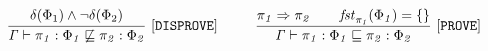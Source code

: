  \begin{gather*}
\frac{
\begin{matrix}
\text{\codeme{\delta(\effect_1) \wedge \neg \delta(\effect_2) }}
\end{matrix}
}{\text{\code{\Gamma  \vdash  \pi_1 : \effect_1 \not\CONTAIN  \pi_2 : \effect_2 }}}\ \codeme{  [DISPROVE]} 
\qquad\ \ 
\frac{
\begin{matrix}
\text{\code{\pi_1 \Rightarrow \pi_2 \quad\ \  
\m{fst}_{\pi_1}(\effect_1) = \{\}
}}
\end{matrix}
}{\text{\code{\Gamma   \vdash  \pi_1 : \effect_1 \CONTAIN  \pi_2 : \effect_2 }}}\ \codeme{  [PROVE]} 
\end{gather*}